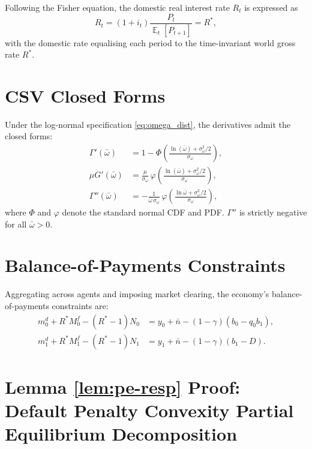 \documentclass[11pt]{article}
\DeclareMathOperator{\E}{\mathbb{E}}
\theoremstyle{definition}
\theoremstyle{plain}
\theoremstyle{remark}
\newcommand{\md}{m^{d}}
\newcommand{\Mf}{M^{f}}
\newcommand{\Rstar}{R^{*}}
\begin{document}
\begin{appendices}
Following the Fisher equation, the domestic real interest rate $R_t$ is expressed as
\begin{equation}
    R_t=(1+i_t)\frac{P_t}{\E_t[P_{t+1}]}=R^*,
\end{equation}
with the domestic rate equalising each period to the time-invariant world gross rate $R^*$.

\section{CSV Closed Forms} \label{ap:csv_closed}

Under the log-normal specification \eqref{eq:omega_dist}, the derivatives admit the closed forms:
\begin{align}
\Gamma'(\bar{\omega}) &= 1 - \Phi\!\left(\frac{\ln(\bar{\omega}) + \sigma_\omega^2/2}{\sigma_\omega}\right), \label{eq:Gammaprime}\\[4pt]
\mu G'(\bar{\omega}) &= \frac{\mu}{\sigma_\omega}\,\varphi\!\left(\frac{\ln(\bar{\omega}) + \sigma_\omega^2/2}{\sigma_\omega}\right), \label{eq:muGprime} \\
\Gamma''(\bar{\omega}) &= -\frac{1}{\bar{\omega}\,\sigma_\omega}\,
\varphi\!\left(\frac{\ln\bar{\omega}
+ \sigma_\omega^2/2}{\sigma_\omega}\right), \label{eq:Gammapp}
\end{align}
where $\Phi$ and $\varphi$ denote the standard normal CDF and PDF. $\Gamma''$ is strictly negative for all $\bar{\omega} > 0$.

\section{Balance-of-Payments Constraints} \label{ap:balance-of-payments}

Aggregating across agents and imposing market clearing, the economy's balance-of-payments constraints are:
\begin{align}
\md_0 + \Rstar  \Mf_0 - (\Rstar - 1)N_0 &= y_0 + \bar{n} - (1-\gamma)(b_0 - q_0 b_1), \label{eq:bop0}\\
\md_1 + \Rstar  \Mf_1 - (\Rstar - 1)N_1 &= y_1 + \bar{n} - (1-\gamma)(b_1 - D). \label{eq:bop1}
\end{align}

\section{Lemma \ref{lem:pe-resp} Proof: Default Penalty Convexity Partial Equilibrium Decomposition} \label{ap:penalty-convexity} 


\end{appendices}
\end{document}
